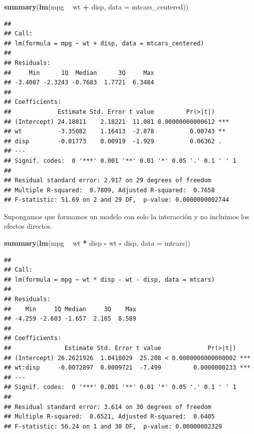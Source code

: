 \documentclass[
  12pt,
]{book}
\newenvironment{Shaded}{\begin{snugshade}}{\end{snugshade}}
\newcommand{\DataTypeTok}[1]{\textcolor[rgb]{0.13,0.29,0.53}{#1}}
\newcommand{\KeywordTok}[1]{\textcolor[rgb]{0.13,0.29,0.53}{\textbf{#1}}}
\newcommand{\NormalTok}[1]{#1}
\newcommand{\OperatorTok}[1]{\textcolor[rgb]{0.81,0.36,0.00}{\textbf{#1}}}
\newcommand{\StringTok}[1]{\textcolor[rgb]{0.31,0.60,0.02}{#1}}
\theoremstyle{definition}
\theoremstyle{definition}
\theoremstyle{definition}
\theoremstyle{remark}
\begin{document}
\begin{Shaded}
\begin{Highlighting}[]
\KeywordTok{summary}\NormalTok{(}\KeywordTok{lm}\NormalTok{(mpg }\OperatorTok{~}\StringTok{ }\NormalTok{wt }\OperatorTok{+}\StringTok{ }\NormalTok{disp, }\DataTypeTok{data =}\NormalTok{ mtcars_centered))}
\end{Highlighting}
\end{Shaded}

\begin{verbatim}
## 
## Call:
## lm(formula = mpg ~ wt + disp, data = mtcars_centered)
## 
## Residuals:
##     Min      1Q  Median      3Q     Max 
## -3.4087 -2.3243 -0.7683  1.7721  6.3484 
## 
## Coefficients:
##             Estimate Std. Error t value         Pr(>|t|)    
## (Intercept) 24.18011    2.18221  11.081 0.00000000000612 ***
## wt          -3.35082    1.16413  -2.878          0.00743 ** 
## disp        -0.01773    0.00919  -1.929          0.06362 .  
## ---
## Signif. codes:  0 '***' 0.001 '**' 0.01 '*' 0.05 '.' 0.1 ' ' 1
## 
## Residual standard error: 2.917 on 29 degrees of freedom
## Multiple R-squared:  0.7809, Adjusted R-squared:  0.7658 
## F-statistic: 51.69 on 2 and 29 DF,  p-value: 0.0000000002744
\end{verbatim}

Supongamos que formamos un modelo con solo la interacción y no incluimos los efectos directos.

\begin{Shaded}
\begin{Highlighting}[]
\KeywordTok{summary}\NormalTok{(}\KeywordTok{lm}\NormalTok{(mpg }\OperatorTok{~}\StringTok{ }\NormalTok{wt }\OperatorTok{*}\StringTok{ }\NormalTok{disp }\OperatorTok{-}\StringTok{ }\NormalTok{wt }\OperatorTok{-}\StringTok{ }\NormalTok{disp, }\DataTypeTok{data =}\NormalTok{ mtcars))}
\end{Highlighting}
\end{Shaded}

\begin{verbatim}
## 
## Call:
## lm(formula = mpg ~ wt * disp - wt - disp, data = mtcars)
## 
## Residuals:
##    Min     1Q Median     3Q    Max 
## -4.259 -2.603 -1.657  2.165  8.589 
## 
## Coefficients:
##               Estimate Std. Error t value             Pr(>|t|)    
## (Intercept) 26.2621926  1.0418029  25.208 < 0.0000000000000002 ***
## wt:disp     -0.0072897  0.0009721  -7.499         0.0000000233 ***
## ---
## Signif. codes:  0 '***' 0.001 '**' 0.01 '*' 0.05 '.' 0.1 ' ' 1
## 
## Residual standard error: 3.614 on 30 degrees of freedom
## Multiple R-squared:  0.6521, Adjusted R-squared:  0.6405 
## F-statistic: 56.24 on 1 and 30 DF,  p-value: 0.00000002329
\end{verbatim}
\end{document}
